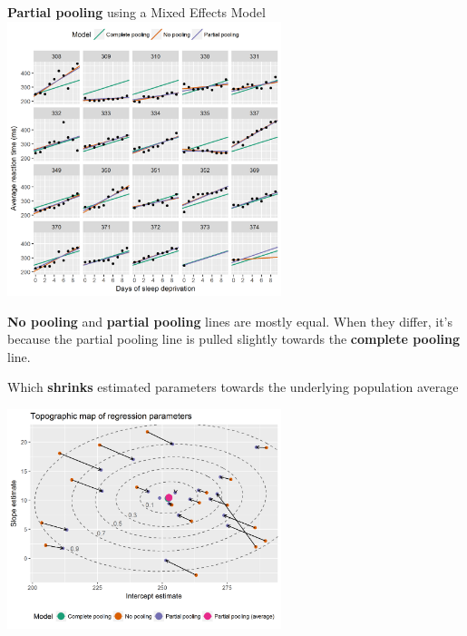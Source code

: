 \documentclass{beamer}
\begin{document}
\begin{frame}
    \textbf{Partial pooling} using a Mixed Effects Model
    \centering
    \includegraphics[width=0.6\textwidth]{lectures/day_5_theory_of_mems/figures/partial-pooling-vs-others-1.png}

    \textbf{No pooling} and \textbf{partial pooling} lines are mostly equal. When they differ, it’s because the partial pooling line is pulled slightly towards the \textbf{complete pooling} line.
    
\end{frame}

\begin{frame}
    Which \textbf{shrinks} estimated parameters towards the underlying population average

    \begin{center}
          \includegraphics[width=0.6\textwidth]{lectures/day_5_theory_of_mems/figures/topographic-map-3-1.png}  
    \end{center}

\end{frame}
\end{document}
